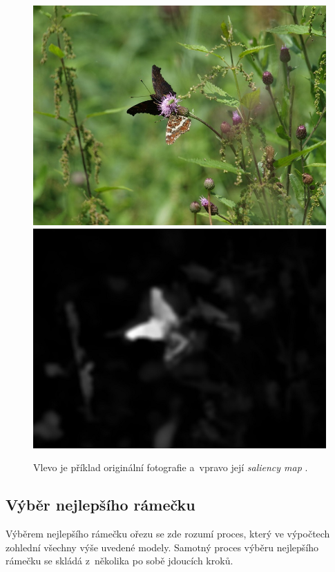 \begin{figure}[H]
  \centering
  \includegraphics[scale=1.0]{obrazky/ORIGmotyl2.JPG} \qquad
  \includegraphics[scale=1.0]{obrazky/MargolinSMmotyl2.jpg}
  \caption{Vlevo je příklad originální fotografie a~vpravo její \emph{saliency map} \cite{Margolin2013}.}
  \label{obr:margolinSM}
\end{figure}


\subsection{Výběr nejlepšího rámečku}
Výběrem nejlepšího rámečku ořezu se zde rozumí proces, který ve výpočtech zohlední všechny výše uvedené modely. Samotný proces výběru nejlepšího rámečku se skládá z~několika po sobě jdoucích kroků.

